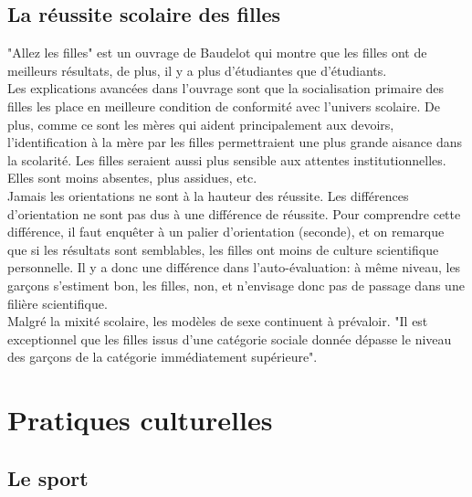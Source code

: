 \documentclass[12pt, a4paper, openany]{book}
\begin{document}
\subsection{La réussite scolaire des filles}

"Allez les filles" est un ouvrage de Baudelot qui montre que les filles ont de meilleurs résultats, de plus, il y a plus d'étudiantes que d'étudiants. \\
Les explications avancées dans l'ouvrage sont que la socialisation primaire des filles les place en meilleure condition de conformité avec l'univers scolaire. De plus, comme ce sont les mères qui aident principalement aux devoirs, l'identification à la mère par les filles permettraient une plus grande aisance dans la scolarité. Les filles seraient aussi plus sensible aux attentes institutionnelles. Elles sont moins absentes, plus assidues, etc. \\
Jamais les orientations ne sont à la hauteur des réussite. Les différences d'orientation ne sont pas dus à une différence de réussite. Pour comprendre cette différence, il faut enquêter à un palier d'orientation (seconde), et on remarque que si les résultats sont semblables, les filles ont moins de culture scientifique personnelle. Il y a donc une différence dans l'auto-évaluation: à même niveau, les garçons s'estiment bon, les filles, non, et n'envisage donc pas de passage dans une filière scientifique. \\
Malgré la mixité scolaire, les modèles de sexe continuent à prévaloir. "Il est exceptionnel que les filles issus d'une catégorie sociale donnée dépasse le niveau des garçons de la catégorie immédiatement supérieure". 

\section{Pratiques culturelles}

\subsection{Le sport}
\end{document}
